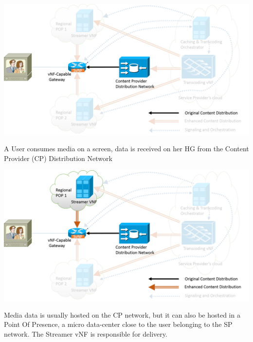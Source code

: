 \documentclass[a4paper]{beamer}
\begin{document}
\begin{frame}[plain,T]{}
	\centering
	\includegraphics[width=0.95\linewidth]{highleveldesign1.png}
	\vspace{2em}
	\begin{block}{}
		A User consumes media on a screen, data is received on her HG from the Content Provider (CP) Distribution Network
	\end{block}
	
\end{frame}

\begin{frame}[plain,T]{}
	\centering
	\includegraphics[width=0.95\linewidth]{highleveldesign2.png}
	\vspace{1em}
	\begin{block}{}
		Media data is usually hosted on the CP network, but it can also be hosted in a Point Of Presence, a micro data-center close to the user belonging to the SP network. The Streamer vNF is responsible for delivery.
	\end{block}
\end{frame}
\end{document}
